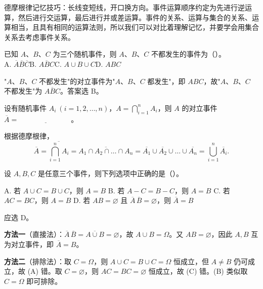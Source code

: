 \documentclass[lang=cn,11pt]{elegantbook}
\begin{document}
\begin{note}
德摩根律记忆技巧：长线变短线，开口换方向。事件运算顺序约定为先进行逆运算，然后进行交运算，最后进行并或差运算。事件的关系、运算与集合的关系、运算相当，且具有相同的运算法则，所以我们可以对比着理解记忆，并要学会用集合关系去考虑事件关系。
\end{note}

\begin{exercise}\label{exer:1-1}
已知 \(A\)、\(B\)、\(C\) 为三个随机事件，则 \(A\)、\(B\)、\(C\) 不都发生的事件为（\quad ）。\\
A. $\overline{A}\overline{B}\overline{C}$\quad B. $\overline{ABC}$\quad C. $A \cup B \cup C$\quad D. $ABC$
\end{exercise}

\begin{solution}
"\(A\)、\(B\)、\(C\) 不都发生"的对立事件为"\(A\)、\(B\)、\(C\) 都发生"，即 \(ABC\)，故"\(A\)、\(B\)、\(C\) 不都发生"为 \(\overline{ABC}\)。答案选 B。
\end{solution}

\begin{exercise}\label{exer:1-2}
设有随机事件 \(A_i\ (i=1,2,\dots,n)\)，\(A = \bigcap_{i=1}^{n} A_i\)，则 \(A\) 的对立事件 \(\overline{A} =\ \underline{\hspace{3cm}}\)。
\end{exercise}

\begin{solution}
根据德摩根律，
\[
\overline{A} = \overline{\bigcap_{i=1}^{n} A_i} = \overline{A_1 \cap A_2 \cap \dots \cap A_n} = \overline{A_1} \cup \overline{A_2} \cup \dots \cup \overline{A_n} = \bigcup_{i=1}^{n} \overline{A_i}.
\]
\end{solution}

\begin{exercise}\label{exer:1-28}
设 \(A,B,C\) 是任意三个事件，则下列选项中正确的是（\quad）。\par
A. 若 \(A\cup C=B\cup C\)，则 \(A=B\)\quad
B. 若 \(A-C=B-C\)，则 \(A=B\)\quad
C. 若 \(AC=BC\)，则 \(A=B\)\quad
D. 若 \(AB=\varnothing\) 且 \(\overline{A}\,\overline{B}=\varnothing\)，则 \(\overline{A}=B\)
\end{exercise}

\begin{solution}
应选 D。

\textbf{方法一}（直接法）：\(\overline{A}\,\overline{B}=\overline{A\cup B}=\varnothing\)，故 \(A\cup B=\Omega\)。又 \(AB=\varnothing\)，因此 \(A,B\) 互为对立事件，即 \(\overline{A}=B\)。

\textbf{方法二}（排除法）：取 \(C=\Omega\)，则 \(A\cup C=B\cup C=\Omega\) 恒成立，但 \(A\neq B\) 仍可成立，故 (A) 错。取 \(C=\varnothing\)，则 \(AC=BC=\varnothing\) 恒成立，故 (C) 错。(B) 类似取 \(C=\Omega\) 即可排除。
\end{solution}
\end{document}
